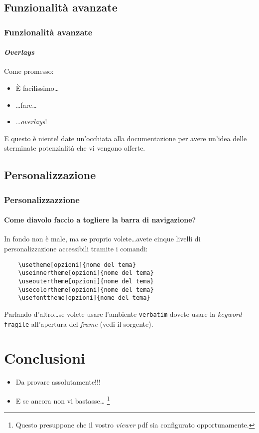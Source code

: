 \documentclass{beamer}
\begin{document}
\subsection{Funzionalit\`a avanzate}
\begin{frame}
  \frametitle{Funzionalit\`a avanzate}
  \framesubtitle{\emph{Overlays}}
  Come promesso:
  \begin{itemize}
  \item<1-> \`E facilissimo\ldots
  \item<2-> \ldots fare\ldots
  \item<3-> \ldots \emph{overlays}\/!      
  \end{itemize}

  \vspace{0.15\textheight}

  \pause[3]
  \begin{beamerboxesrounded}[upper=uppercolor, lower=lowercolor, shadow=true]
    {E questo \`e niente!}
    date un'occhiata alla documentazione per avere un'idea delle sterminate
    potenzialit\`a che vi vengono offerte.
  \end{beamerboxesrounded}
\end{frame}

\subsection{Personalizzazione}
\begin{frame}[fragile]  %
  \frametitle{Personalizzazzione}
  \framesubtitle{Come diavolo faccio a togliere la barra di navigazione?}
  In fondo non \`e male, ma se proprio volete\ldots avete cinque livelli
  di personalizzazione accessibili tramite i comandi:
  \begin{verbatim}
    \usetheme[opzioni]{nome del tema}
    \useinnertheme[opzioni]{nome del tema}
    \useoutertheme[opzioni]{nome del tema}
    \usecolortheme[opzioni]{nome del tema}
    \usefonttheme[opzioni]{nome del tema}
  \end{verbatim}

  Parlando d'altro\ldots se volete usare l'ambiente {\tt verbatim} dovete
  usare la \emph{keyword} {\tt fragile} all'apertura del \emph{frame}
  (vedi il sorgente).
\end{frame}

\section{Conclusioni}
\begin{frame}
  \begin{itemize}
  \item Da provare assolutamente!!!
  \item E se ancora non vi bastasse\ldots
    \footnote{Questo presuppone che il vostro \emph{viewer} pdf sia
      configurato opportunamente.}
  \end{itemize}
\end{frame}
\end{document}
